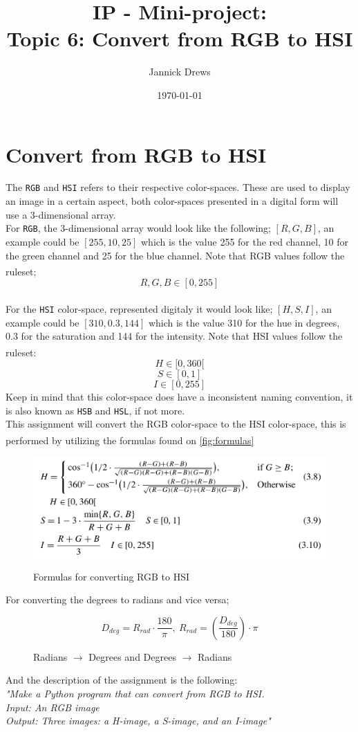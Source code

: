 \documentclass{article}
\title{IP - Mini-project:\\Topic 6: Convert from RGB to HSI}
\author{Jannick Drews}
\date{\today}
\newcommand{\goodcite}[1]{\textsuperscript{\cite{#1}}}
\begin{document}
\maketitle
\newpage
{}

\section{Convert from RGB to HSI}
The \texttt{RGB} and \texttt{HSI} refers to their respective color-spaces. These are used to display an image in a certain aspect, both color-spaces presented in a digital form will use a 3-dimensional array.\\
For \texttt{RGB}, the 3-dimensional array would look like the following; $[R, G, B]$, an example could be $[255, 10, 25]$ which is the value 255 for the red channel, 10 for the green channel and 25 for the blue channel. Note that RGB values follow the ruleset\goodcite{IP}; $$ R,G,B \in [0, 255] $$\\
For the \texttt{HSI} color-space, represented digitaly it would look like; $[H, S, I]$, an example could be $[310, 0.3, 144]$ which is the value 310 for the hue in degrees, 0.3 for the saturation and 144 for the intensity. Note that HSI values follow the ruleset\goodcite{IP}: $$ H \in [0, 360[ $$ $$ S \in [0, 1]$$ $$ I \in [0, 255]$$ Keep in mind that this color-space does have a inconsistent naming convention, it is also known as \texttt{HSB} and \texttt{HSL}, if not more.\medskip \\
This assignment will convert the RGB color-space to the HSI color-space, this is performed by utilizing the formulas found on \autoref{fig:formulas} \goodcite{IP}
\begin{figure}[H]
    \centering
    \includegraphics[width=\textwidth]{img/formula.png}
    \caption{Formulas for converting RGB to HSI\goodcite{IP}}
    \label{fig:formulas}
\end{figure}
For converting the degrees to radians and vice versa;
\begin{figure}[H]
    \centering
    $$ D_{deg} = R_{rad} \cdot \frac{180}{\pi},\ R_{rad} = (\frac{D_{deg}}{180}) \cdot \pi $$
    \caption{Radians $\rightarrow$ Degrees and Degrees $\rightarrow$ Radians}
    \label{fig:convert}
\end{figure}
And the description of the assignment is the following:\\
\textit{"Make a Python program that can convert from RGB to HSI.\\Input: An RGB image\\Output: Three images: a H-image, a S-image, and an I-image"}
\end{document}
